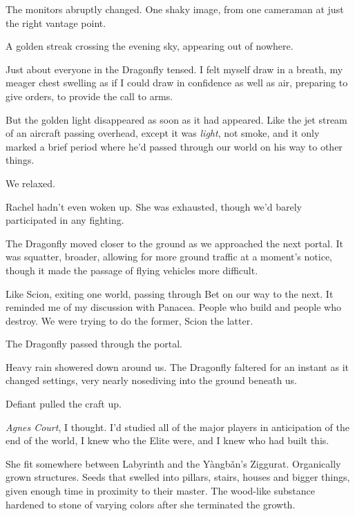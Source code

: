 The monitors abruptly changed.  One shaky image, from one cameraman at just the right vantage point.



A golden streak crossing the evening sky, appearing out of nowhere.



Just about everyone in the Dragonfly tensed.  I felt myself draw in a breath, my meager chest swelling as if I could draw in confidence as well as air, preparing to give orders, to provide the call to arms.



But the golden light disappeared as soon as it had appeared.  Like the jet stream of an aircraft passing overhead, except it was \emph{light}, not smoke, and it only marked a brief period where he'd passed through our world on his way to other things.



We relaxed.



Rachel hadn't even woken up.  She was exhausted, though we'd barely participated in any fighting.



The Dragonfly moved closer to the ground as we approached the next portal.  It was squatter, broader, allowing for more ground traffic at a moment's notice, though it made the passage of flying vehicles more difficult.



Like Scion, exiting one world, passing through Bet on our way to the next.  It reminded me of my discussion with Panacea.  People who build and people who destroy.  We were trying to do the former, Scion the latter.



The Dragonfly passed through the portal.



Heavy rain showered down around us.  The Dragonfly faltered for an instant as it changed settings, very nearly nosediving into the ground beneath us.



Defiant pulled the craft up.



\emph{Agnes Court}, I thought.  I'd studied all of the major players in anticipation of the end of the world, I knew who the Elite were, and I knew who had built this.



She fit somewhere between Labyrinth and the Y\`{a}ngb\v{a}n's Ziggurat.  Organically grown structures.  Seeds that swelled into pillars, stairs, houses and bigger things, given enough time in proximity to their master.  The wood-like substance hardened to stone of varying colors after she terminated the growth.



